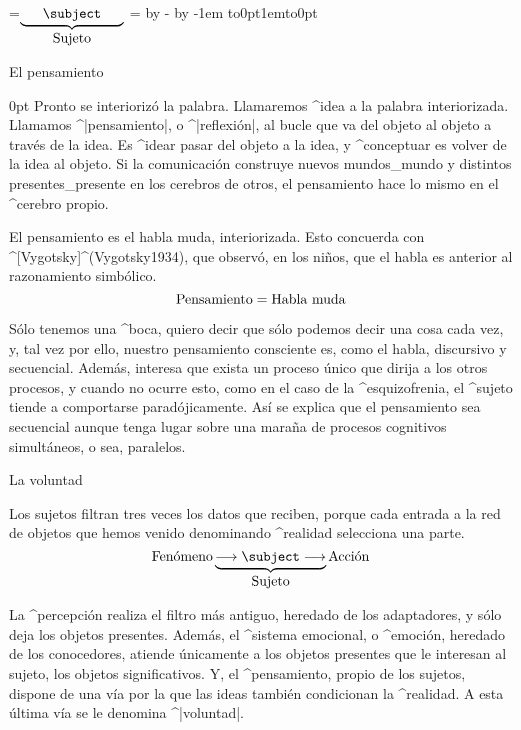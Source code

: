 =\hbox{$\underbrace{\phantom{\longrightarrow}%
   \subject
   \phantom{\longrightarrow}}_{\hbox{Sujeto}}$}
=\hsize \advance{} by - \advance{} by -1em
\nointerlineskip
\hbox to0pt{\kern{}\kern1em\vbox to0pt{\kern2pc\vss}\hss}
\nointerlineskip

\Section El pensamiento

 0pt 
Pronto se interiorizó la palabra. Llamaremos ^{idea} a la palabra
interiorizada. Llamamos ^|pensamiento|, o ^|reflexión|, al bucle que va
del objeto al objeto a través de la idea. Es ^{idear} pasar del objeto a
la idea, y ^{conceptuar} es volver de la idea al objeto. Si la
comunicación construye nuevos mundos_{mundo} y distintos
presentes_{presente} en los cerebros de otros, el pensamiento hace lo
mismo en el ^{cerebro} propio.


El pensamiento es el habla muda, interiorizada. Esto concuerda con
^[Vygotsky]^(Vygotsky1934), que observó, en los niños, que el habla es
anterior al razonamiento simbólico.
$$\hbox{Pensamiento} = \hbox{Habla muda}$$

Sólo tenemos una ^{boca}, quiero decir que sólo podemos decir una cosa
cada vez, y, tal vez por ello, nuestro pensamiento consciente es, como
el habla, discursivo y secuencial. Además, interesa que exista un
proceso único que dirija a los otros procesos, y cuando no ocurre esto,
como en el caso de la ^{esquizofrenia}, el ^{sujeto} tiende a
comportarse paradójicamente. Así se explica que el pensamiento sea
secuencial aunque tenga lugar sobre una maraña de procesos cognitivos
simultáneos, o sea, paralelos.


\Section La voluntad

Los sujetos filtran tres veces los datos que reciben, porque cada
entrada a la red de objetos que hemos venido denominando ^{realidad}
selecciona una parte.
$$\hbox{Fenómeno}
  \underbrace{\longrightarrow\subject
   \longrightarrow}_{\hbox{Sujeto}}
  \hbox{Acción}
\abovedisplayskip=\abovedisplayshortskip
\belowdisplayskip=\belowdisplayshortskip
$$

La ^{percepción} realiza el filtro más antiguo, heredado de los
adaptadores, y sólo deja los objetos presentes. Además, el ^{sistema
emocional}, o ^{emoción}, heredado de los conocedores, atiende
únicamente a los objetos presentes que le interesan al sujeto, los
objetos significativos. Y, el ^{pensamiento}, propio de los sujetos,
dispone de una vía por la que las ideas también condicionan la
^{realidad}. A esta última vía se le denomina ^|voluntad|.

